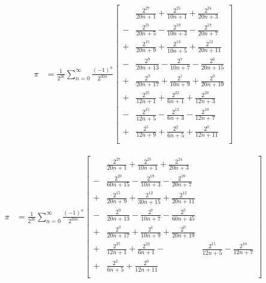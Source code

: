 \documentclass[11pt]{article}
\begin{document}
\begin{equation}
\begin{split}
  \pi
  &= \frac{1}{2^{26}} \sum_{n = 0}^\infty \frac{(-1)^n}{2^{30n}} \left[
    \begin{aligned}
    &  \frac{2^{27}}{20n+1}
    +  \frac{2^{25}}{10n+1}
    +  \frac{2^{24}}{20n+3} \\
    -& \frac{2^{21}}{20n+5}
    -  \frac{2^{19}}{10n+3}
    -  \frac{2^{18}}{20n+7} \\
    +& \frac{2^{15}}{20n+9}
    +  \frac{2^{13}}{10n+5}
    +  \frac{2^{12}}{20n+11} \\
    -& \frac{2^{9}}{20n+13} 
    -  \frac{2^{7}}{10n+7}
    -  \frac{2^{6}}{20n+15} \\
    +& \frac{2^{3}}{20n+17}
    +  \frac{2^{1}}{10n+9}
    +  \frac{2^{0}}{20n+19} \\
    +&  \frac{2^{25}}{12n+1}
    +  \frac{2^{22}}{6n+1}
    +  \frac{2^{20}}{12n+3} \\
    -& \frac{2^{15}}{12n+5}
    -  \frac{2^{12}}{6n+3}
    -  \frac{2^{10}}{12n+7} \\
    +& \frac{2^{5}}{12n+9}
    +  \frac{2^{2}}{6n+5}
    +  \frac{2^{0}}{12n+11} \\
    \end{aligned}
  \right]
\end{split}
\end{equation}

\begin{equation}
\begin{split}
  \pi
  &= \frac{1}{2^{26}} \sum_{n = 0}^\infty \frac{(-1)^n}{2^{30n}} \left[
    \begin{aligned}
    &  \frac{2^{27}}{20n+1}
    +  \frac{2^{25}}{10n+1}
    +  \frac{2^{24}}{20n+3} \\
    -& \frac{2^{20}}{60n+15}
    -  \frac{2^{19}}{10n+3}
    -  \frac{2^{18}}{20n+7} \\
    +& \frac{2^{15}}{20n+9}
    +  \frac{2^{12}}{30n+15}
    +  \frac{2^{12}}{20n+11} \\
    -& \frac{2^{9}}{20n+13} 
    -  \frac{2^{7}}{10n+7}
    -  \frac{2^{5}}{60n+45} \\
    +& \frac{2^{3}}{20n+17}
    +  \frac{2^{1}}{10n+9}
    +  \frac{2^{0}}{20n+19} \\
    +& \frac{2^{25}}{12n+1}
    +  \frac{2^{22}}{6n+1}
    -& \frac{2^{15}}{12n+5}
    -  \frac{2^{10}}{12n+7} \\
    +& \frac{2^{2}}{6n+5}
    +  \frac{2^{0}}{12n+11} \\
    \end{aligned}
  \right]
\end{split}
\end{equation}
\end{document}
